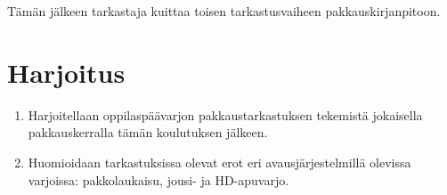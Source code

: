 Tämän jälkeen tarkastaja kuittaa toisen tarkastusvaiheen pakkauskirjanpitoon. 

\section{ Harjoitus }
\label{pakkaustarkastus-harjoitus}

\begin{enumerate}[label=\bfseries \arabic*)]
\item  Harjoitellaan oppilaspäävarjon pakkaustarkastuksen tekemistä jokaisella pakkauskerralla tämän koulutuksen jälkeen. 
\item  Huomioidaan tarkastuksissa olevat erot eri avausjärjestelmillä olevissa varjoissa: pakkolaukaisu, jousi- ja HD-apuvarjo. 
\end{enumerate}
